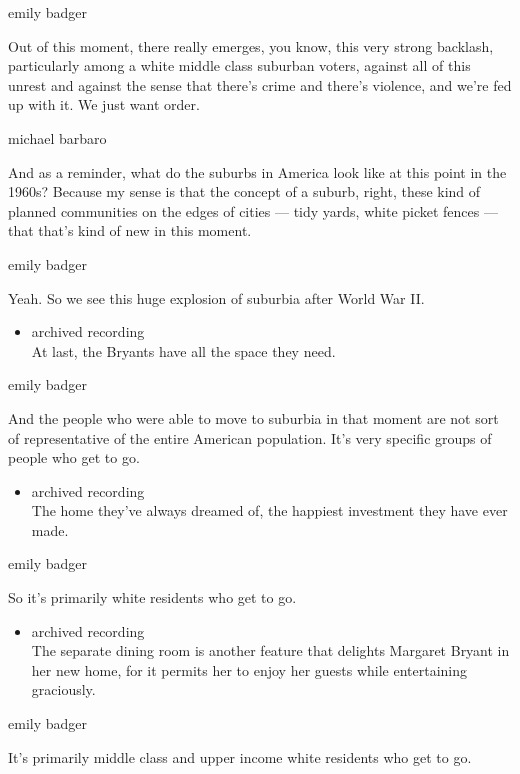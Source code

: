 emily badger

Out of this moment, there really emerges, you know, this very strong
backlash, particularly among a white middle class suburban voters,
against all of this unrest and against the sense that there's crime and
there's violence, and we're fed up with it. We just want order.

michael barbaro

And as a reminder, what do the suburbs in America look like at this
point in the 1960s? Because my sense is that the concept of a suburb,
right, these kind of planned communities on the edges of cities --- tidy
yards, white picket fences --- that that's kind of new in this moment.

emily badger

Yeah. So we see this huge explosion of suburbia after World War II.

\begin{itemize}
\tightlist
\item
  archived recording\\
  At last, the Bryants have all the space they need.
\end{itemize}

emily badger

And the people who were able to move to suburbia in that moment are not
sort of representative of the entire American population. It's very
specific groups of people who get to go.

\begin{itemize}
\tightlist
\item
  archived recording\\
  The home they've always dreamed of, the happiest investment they have
  ever made.
\end{itemize}

emily badger

So it's primarily white residents who get to go.

\begin{itemize}
\tightlist
\item
  archived recording\\
  The separate dining room is another feature that delights Margaret
  Bryant in her new home, for it permits her to enjoy her guests while
  entertaining graciously.
\end{itemize}

emily badger

It's primarily middle class and upper income white residents who get to
go.


